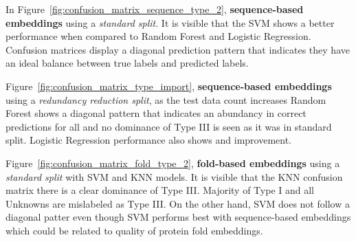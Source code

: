 In Figure~\ref{fig:confusion_matrix_sequence_type_2}, \textbf{sequence-based embeddings} using a \textit{standard split}. It is visible that the \gls{SVM} shows a better performance when compared to Random Forest and Logistic Regression. Confusion matrices display a diagonal prediction pattern that indicates they have an ideal balance between true labels and predicted labels.

Figure~\ref{fig:confusion_matrix_type_import}, \textbf{sequence-based embeddings} using a \textit{redundancy reduction split}, as the test data count increases Random Forest shows a diagonal pattern that indicates an abundancy in correct predictions for all and no dominance of Type III is seen as it was in standard split. Logistic Regression performance also shows and improvement.

Figure~\ref{fig:confusion_matrix_fold_type_2}, \textbf{fold-based embeddings} using a \textit{standard split} with \gls{SVM} and \gls{KNN} models. It is visible that the \gls{KNN} confusion matrix there is a clear dominance of Type III. Majority of Type I and all Unknowns are mislabeled as Type III. On the other hand,  \gls{SVM} does not follow a diagonal patter even though  \gls{SVM} performs best with sequence-based embeddings which could be related to quality of protein fold embeddings.






